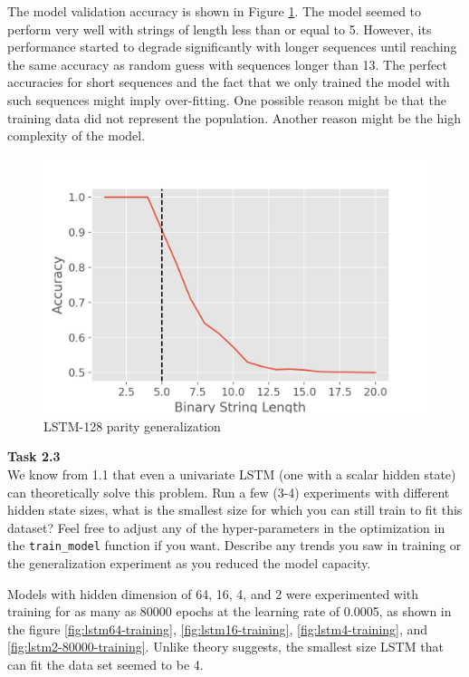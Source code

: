 \documentclass[12pt,article]{article}
\newenvironment{task}[2][Task]
    { \begin{mdframed}[backgroundcolor=gray!20] \textbf{#1 #2} \\}
    {  \end{mdframed}}
\begin{document}
The model validation accuracy is shown in Figure \ref{fig:lstm128-generalization}. The model seemed to perform very well with strings of length less than or equal to 5. However, its performance started to degrade significantly with longer sequences until reaching the same accuracy as random guess with sequences longer than 13. The perfect accuracies for short sequences and the fact that we only trained the model with such sequences might imply over-fitting. One possible reason might be that the training data did not represent the population. Another reason might be the high complexity of the model.

\begin{figure}[H]
    \centering
    \includegraphics[scale=0.5]{LSTM-64_parity_generalization.png} \par
    \caption{LSTM-128 parity generalization}
    \label{fig:lstm128-generalization}
\end{figure}

\newpage
\begin{task}{2.3} 
We know from 1.1 that even a univariate LSTM (one with a scalar hidden state) can theoretically solve this problem. Run a few (3-4) experiments with different hidden state sizes, what is the smallest size for which you can still train to fit this dataset? Feel free to adjust any of the hyper-parameters in the optimization in the \texttt{train\_model} function if you want. Describe any trends you saw in training or the generalization experiment as you reduced the model capacity.
\end{task}

Models with hidden dimension of 64, 16, 4, and 2 were experimented with training for as many as 80000 epochs at the learning rate of 0.0005, as shown in the figure \ref{fig:lstm64-training}, \ref{fig:lstm16-training}, \ref{fig:lstm4-training}, and \ref{fig:lstm2-80000-training}. Unlike theory suggests, the smallest size LSTM that can fit the data set seemed to be 4. 
\end{document}
